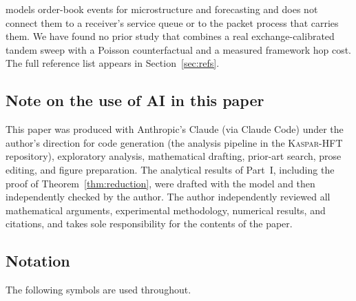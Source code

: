 \documentclass[11pt]{article}
\newcommand{\kasparhft}{\textsc{Kaspar-HFT}}
\begin{document}
\citep{filimonovsornette2012,filimonovsornette2015,hardimanbercotbouchaud2013,achab2018branching,bacry2015review}
models order-book events for microstructure and forecasting and does not connect them to
a receiver's service queue or to the packet process that carries them. We have found no
prior study that combines a real exchange-calibrated tandem sweep with a Poisson
counterfactual and a measured framework hop cost. The full reference list appears in
Section~\ref{sec:refs}.

\subsection{Note on the use of AI in this paper}
\label{sec:intro-ai-use}

This paper was produced with Anthropic's Claude (via Claude Code) under the author's
direction for code generation (the analysis pipeline in the \kasparhft{} repository),
exploratory analysis, mathematical drafting, prior-art search, prose editing, and figure
preparation. The analytical results of Part~I, including the proof of
Theorem~\ref{thm:reduction}, were drafted with the model and then independently checked by
the author. The author independently reviewed all mathematical
arguments, experimental methodology, numerical results, and citations, and takes sole
responsibility for the contents of the paper.

\subsection{Notation}
\label{sec:notation}

The following symbols are used throughout.
\end{document}

